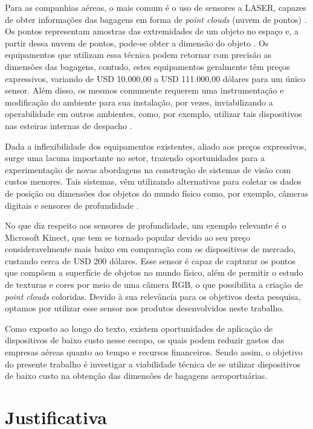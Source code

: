 Para as companhias aéreas, o mais comum é o uso de sensores a LASER, capazes de obter informações das bagagens em forma de \textit{point clouds} (nuvem de pontos) \cite{gao_2021_airline}. Os pontos representam amostras das extremidades de um objeto no espaço e, a partir dessa nuvem de pontos, pode-se obter a dimensão do objeto \cite{chen_2013_research}. Os equipamentos que utilizam essa técnica podem retornar com precisão as dimensões das bagagens, contudo, estes equipamentos geralmente têm preços expressivos, variando de USD 10.000,00 a USD 111.000,00 dólares para um único sensor. Além disso, os mesmos comumente requerem uma instrumentação e modificação do ambiente para sua instalação, por vezes, inviabilizando a operabilidade em outros ambientes, como, por exemplo, utilizar tais dispositivos nas esteiras internas de despacho \cite{wan_2012_a, gao_2018_minimum}.

Dada a inflexibilidade dos equipamentos existentes, aliado aos preços expressivos, surge uma lacuna importante no setor, trazendo oportunidades para a experimentação de novas abordagens na construção de sistemas de visão com custos menores. Tais sistemas, vêm utilizando alternativas para coletar os dados de posição ou dimensões dos objetos do mundo físico como, por exemplo, câmeras digitais e sensores de profundidade \cite{chan_2018_an}.

No que diz respeito aos sensores de profundidade, um exemplo relevante é o Microsoft Kinect, que tem se tornado popular devido ao seu preço consideravelmente mais baixo em comparação com os dispositivos de mercado, custando cerca de USD 200 dólares. Esse sensor é capaz de capturar os pontos que compõem a superfície de objetos no mundo físico, além de permitir o estudo de texturas e cores por meio de uma câmera RGB, o que possibilita a criação de \textit{point clouds} coloridas. Devido à sua relevância para os objetivos desta pesquisa, optamos por utilizar esse sensor nos produtos desenvolvidos neste trabalho.

Como exposto ao longo do texto, existem oportunidades de aplicação de dispositivos de baixo custo nesse escopo, os quais podem reduzir gastos das empresas aéreas quanto ao tempo e recursos financeiros. Sendo assim, o objetivo do presente trabalho é investigar a viabilidade técnica de se utilizar dispositivos de baixo custo na obtenção das dimensões de bagagens aeroportuárias.

\section{Justificativa}
\label{sec_Justificativa}

